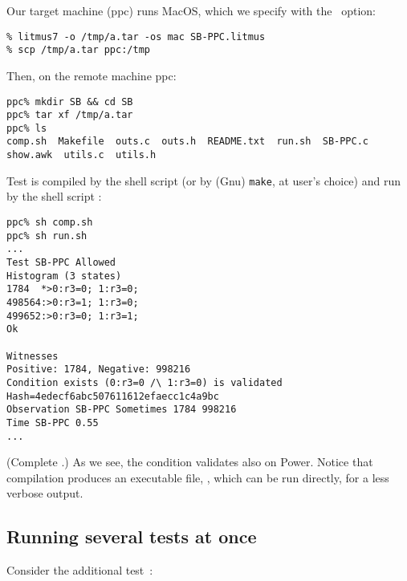 Our target machine (ppc) runs MacOS, which we specify with the ~option:
\begin{verbatim}
% litmus7 -o /tmp/a.tar -os mac SB-PPC.litmus
% scp /tmp/a.tar ppc:/tmp
\end{verbatim}
Then, on the remote machine ppc:
\begin{verbatim}
ppc% mkdir SB && cd SB
ppc% tar xf /tmp/a.tar
ppc% ls
comp.sh  Makefile  outs.c  outs.h  README.txt  run.sh  SB-PPC.c  show.awk  utils.c  utils.h
\end{verbatim}
Test is compiled by the shell script  (or
by (Gnu) \texttt{make}, at user's choice) and run by the shell script
:
\begin{verbatim}
ppc% sh comp.sh
ppc% sh run.sh
...
Test SB-PPC Allowed
Histogram (3 states)
1784  *>0:r3=0; 1:r3=0;
498564:>0:r3=1; 1:r3=0;
499652:>0:r3=0; 1:r3=1;
Ok

Witnesses
Positive: 1784, Negative: 998216
Condition exists (0:r3=0 /\ 1:r3=0) is validated
Hash=4edecf6abc507611612efaecc1c4a9bc
Observation SB-PPC Sometimes 1784 998216
Time SB-PPC 0.55
...
\end{verbatim}
\ifhevea(Complete .) \fi
As we see, the condition validates also on Power.
Notice that compilation produces an executable file, ,
which can be run directly, for a less verbose output.


\subsection{Running several tests at once}

\label{stfw}Consider the additional test~:


